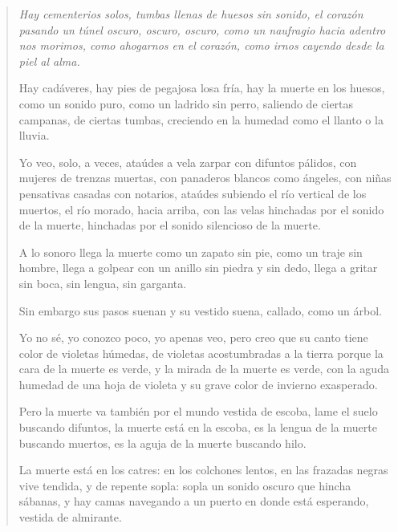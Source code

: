 \documentclass[12pt]{article}
\begin{document}
\clearpage
{}
\begin{verse}
\itshape
Hay cementerios solos,  
tumbas llenas de huesos sin sonido,  
el corazón pasando un túnel  
oscuro, oscuro, oscuro,  
como un naufragio hacia adentro nos morimos,  
como ahogarnos en el corazón,  
como irnos cayendo desde la piel al alma.  
	
Hay cadáveres,  
hay pies de pegajosa losa fría,  
hay la muerte en los huesos,  
como un sonido puro,  
como un ladrido sin perro,  
saliendo de ciertas campanas, de ciertas tumbas,  
creciendo en la humedad como el llanto o la lluvia.  
	
Yo veo, solo, a veces,  
ataúdes a vela  
zarpar con difuntos pálidos, con mujeres de trenzas muertas,  
con panaderos blancos como ángeles,  
con niñas pensativas casadas con notarios,  
ataúdes subiendo el río vertical de los muertos,  
el río morado,  
hacia arriba, con las velas hinchadas por el sonido de la muerte,  
hinchadas por el sonido silencioso de la muerte.  
	
A lo sonoro llega la muerte  
como un zapato sin pie, como un traje sin hombre,  
llega a golpear con un anillo sin piedra y sin dedo,  
llega a gritar sin boca, sin lengua, sin garganta.  
	
Sin embargo sus pasos suenan  
y su vestido suena, callado, como un árbol.  
	
Yo no sé, yo conozco poco, yo apenas veo,  
pero creo que su canto tiene color de violetas húmedas,  
de violetas acostumbradas a la tierra  
porque la cara de la muerte es verde,  
y la mirada de la muerte es verde,  
con la aguda humedad de una hoja de violeta  
y su grave color de invierno exasperado.  
	
Pero la muerte va también por el mundo vestida de escoba,  
lame el suelo buscando difuntos,  
la muerte está en la escoba,  
es la lengua de la muerte buscando muertos,  
es la aguja de la muerte buscando hilo.  
	
La muerte está en los catres:  
en los colchones lentos, en las frazadas negras  
vive tendida, y de repente sopla:  
sopla un sonido oscuro que hincha sábanas,  
y hay camas navegando a un puerto  
en donde está esperando, vestida de almirante.  

\end{verse}
\end{document}
